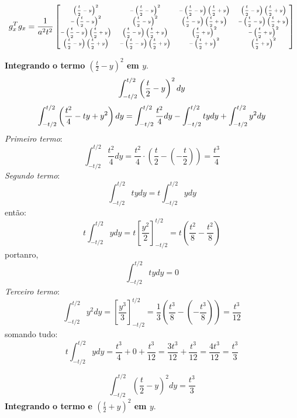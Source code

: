 \documentclass[
12pt,
a4paper,
oneside,
chapter=TITLE,
sumario=tradicional
]{abntex2}
\begin{document}
 
 \begin{equation*}\tiny
 g_x^T g_x =  
 \frac{1}{a^2 t^2}  
 \begin{bmatrix}  
 	\left(\dfrac{t}{2} - y\right)^2 &  
 	-\left(\dfrac{t}{2} - y\right)^2 &  
 	-\left(\dfrac{t}{2} - y\right)\left(\dfrac{t}{2} + y\right) &  
 	\left(\dfrac{t}{2} - y\right)\left(\dfrac{t}{2} + y\right) \\  
 	-\left(\dfrac{t}{2} - y\right)^2 &  
 	\left(\dfrac{t}{2} - y\right)^2 &  
 	\left(\dfrac{t}{2} - y\right)\left(\dfrac{t}{2} + y\right) &  
 	-\left(\dfrac{t}{2} - y\right)\left(\dfrac{t}{2} + y\right) \\  
 	-\left(\dfrac{t}{2} - y\right)\left(\dfrac{t}{2} + y\right) &  
 	\left(\dfrac{t}{2} - y\right)\left(\dfrac{t}{2} + y\right) &  
 	\left(\dfrac{t}{2} + y\right)^2 &  
 	-\left(\dfrac{t}{2} + y\right)^2 \\  
 	\left(\dfrac{t}{2} - y\right)\left(\dfrac{t}{2} + y\right) &  
 	-\left(\dfrac{t}{2} - y\right)\left(\dfrac{t}{2} + y\right) &  
 	-\left(\dfrac{t}{2} + y\right)^2 &  
 	\left(\dfrac{t}{2} + y\right)^2  
 \end{bmatrix}  
\end{equation*}
 
\textbf{Integrando o termo $(\frac{t}{2} - y)^2$ em $y$}.
 \begin{equation*}\tiny 
\int_{-t/2}^{t/2} \left(\frac{t}{2} - y\right)^2 dy 
\end{equation*}
 \begin{equation*}\tiny 
\int_{-t/2}^{t/2} \left(\frac{t^2}{4} - t y + y^2 \right) dy
= \int_{-t/2}^{t/2} \frac{t^2}{4}  dy
-
\int_{-t/2}^{t/2} t y  dy  
+  
\int_{-t/2}^{t/2} y^2  dy  
\end{equation*}
\textit{Primeiro termo}:
$$  
\int_{-t/2}^{t/2} \frac{t^2}{4}  dy
=\frac{t^2}{4} \cdot \left(\frac{t}{2}-(-\frac{t}{2}) \right)
=
\frac{t^3}{4}  
$$
\textit{Segundo termo}:
$$  
\int_{-t/2}^{t/2} t y  dy
=
t \int_{-t/2}^{t/2} y  dy  
$$
então:
$$  
t \int_{-t/2}^{t/2} y  dy
=
t \left[\frac{y^2}{2}\right]_{-t/2}^{t/2}  = t\left(\frac{t^2}{8} - \frac{t^2}{8}\right)  
$$
portanro,
$$\int_{-t/2}^{t/2} t y  dy = 0$$
\textit{Terceiro termo}:
$$  
\int_{-t/2}^{t/2} y^2 dy
= \left[\frac{y^3}{3}\right]_{-t/2}^{t/2}
= \frac{1}{3}\left(\frac{t^3}{8} - \left(-\frac{t^3}{8}\right)\right)
=
\frac{t^3}{12}  
$$
somando tudo:
$$ t \int_{-t/2}^{t/2} y  dy
= 
\frac{t^3}{4} + 0 + \frac{t^3}{12}
= \frac{3t^3}{12} + \frac{t^3}{12}
= \frac{4t^3}{12}
=
\frac{t^3}{3}  
$$

\begin{equation}
\int_{-t/2}^{t/2} \left(\frac{t}{2} - y\right)^2 dy = \frac{t^3}{3}
\label{eq:MEF_eq_0038}  
\end{equation}
\textbf{Integrando o termo  e $(\frac{t}{2} + y)^2$ em $y$}.
\end{document}
